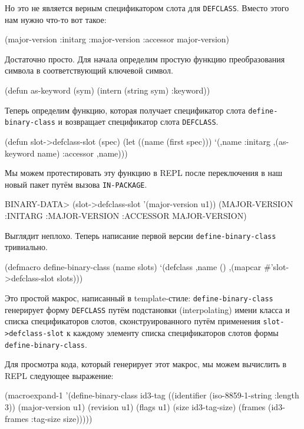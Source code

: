Но это не является верным спецификатором слота для \lstinline{DEFCLASS}. Вместо этого нам
нужно что-то вот такое:

\begin{myverb}
(major-version :initarg :major-version :accessor major-version)
\end{myverb}

Достаточно просто. Для начала определим простую функцию преобразования символа в
соответствующий ключевой символ.

\begin{myverb}
(defun as-keyword (sym) (intern (string sym) :keyword))
\end{myverb}

Теперь определим функцию, которая получает спецификатор слота \lstinline{define-binary-class} и возвращает спецификатор слота \lstinline{DEFCLASS}.

\begin{myverb}
(defun slot->defclass-slot (spec)
  (let ((name (first spec)))
    `(,name :initarg ,(as-keyword name) :accessor ,name)))
\end{myverb}

Мы можем протестировать эту функцию в REPL после переключения в наш новый пакет путём
вызова \lstinline{IN-PACKAGE}.

\begin{myverb}
BINARY-DATA> (slot->defclass-slot '(major-version u1))
(MAJOR-VERSION :INITARG :MAJOR-VERSION :ACCESSOR MAJOR-VERSION)
\end{myverb}

Выглядит неплохо. Теперь написание первой версии \lstinline{define-binary-class} тривиально.

\begin{myverb}
(defmacro define-binary-class (name slots)
  `(defclass ,name ()
     ,(mapcar #'slot->defclass-slot slots)))
\end{myverb}

Это простой макрос, написанный в template-стиле: \lstinline{define-binary-class} генерирует
форму \lstinline{DEFCLASS} путём подстановки (interpolating) имени класса и списка
спецификаторов слотов, сконструированного путём применения \lstinline{slot->defclass-slot} к
каждому элементу списка спецификаторов слотов формы \lstinline{define-binary-class}.

Для просмотра кода, который генерирует этот макрос, мы можем вычислить в REPL следующее
выражение:

\begin{myverb}
(macroexpand-1 '(define-binary-class id3-tag
  ((identifier      (iso-8859-1-string :length 3))
   (major-version   u1)
   (revision        u1)
   (flags           u1)
   (size            id3-tag-size)
   (frames          (id3-frames :tag-size size)))))
\end{myverb}

